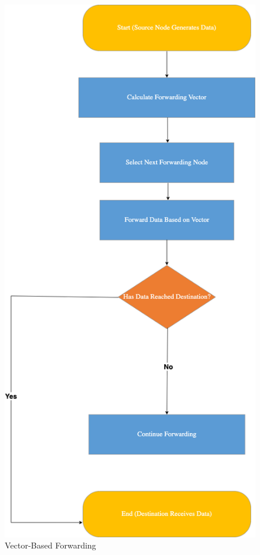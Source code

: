 \documentclass[]{nsm-thesis}
\begin{document}
\begin{figure}[h]
\graphicspath{{/image/}} %
\centering
\includegraphics[scale=0.4]{image/Untitled Diagram.drawio.png} %
\caption{Vector-Based Forwarding\cite{10.1007/11753810_111}}
\label{fig:mesh2} %
\end{figure}
\clearpage
\end{document}

